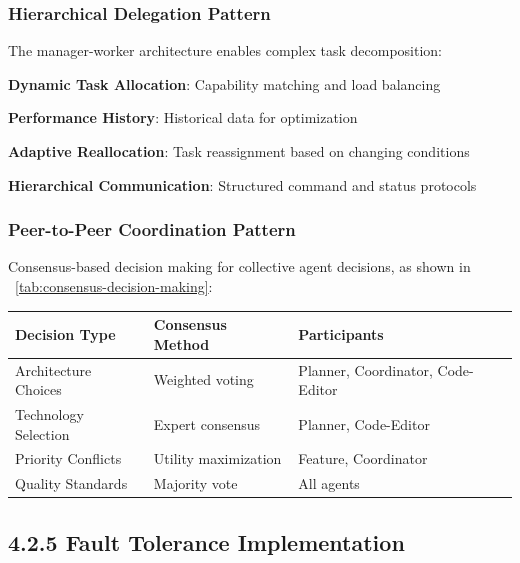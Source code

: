 \subsubsection*{Hierarchical Delegation Pattern}

The manager-worker architecture enables complex task decomposition:

\begin{compactlist}
    \item \textbf{Dynamic Task Allocation}: Capability matching and load balancing
    \item \textbf{Performance History}: Historical data for optimization
    \item \textbf{Adaptive Reallocation}: Task reassignment based on changing conditions
    \item \textbf{Hierarchical Communication}: Structured command and status protocols
\end{compactlist}

\subsubsection*{Peer-to-Peer Coordination Pattern}

Consensus-based decision making for collective agent decisions, as shown in ~\ref{tab:consensus-decision-making}:

\begin{center}
\begin{tabular}{@{}lll@{}}
\toprule
\textbf{Decision Type} & \textbf{Consensus Method} & \textbf{Participants} \\
\midrule
Architecture Choices & Weighted voting & Planner, Coordinator, Code-Editor \\
Technology Selection & Expert consensus & Planner, Code-Editor \\
Priority Conflicts & Utility maximization & Feature, Coordinator \\
Quality Standards & Majority vote & All agents \\
\bottomrule
\end{tabular}
\label{tab:consensus-decision-making}
\end{center}

\subsection*{4.2.5 Fault Tolerance Implementation}

